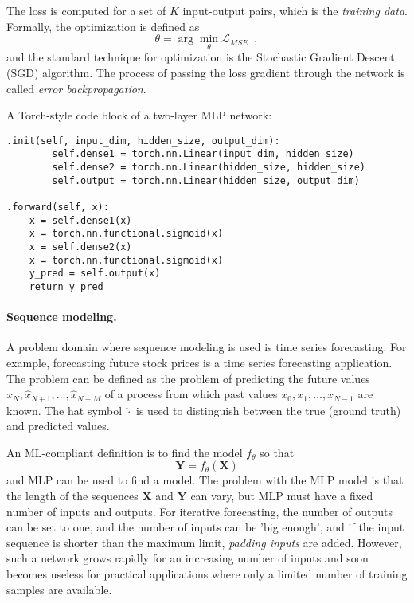 \documentclass[final]{article}
\begin{document}
The loss is computed for a set of $K$ input-output pairs, which is
the \textit{training data}. Formally, the optimization is defined
as
\[
\theta = \arg\min_{\theta} \mathcal{L}_{MSE} \enspace ,
\]
and the standard technique for optimization is the Stochastic Gradient
Descent (SGD) algorithm. The process of passing the loss gradient
through the network is called \textit{error backpropagation}.

A Torch-style code block of a two-layer MLP network:
\begin{lstlisting}
.init(self, input_dim, hidden_size, output_dim):
        self.dense1 = torch.nn.Linear(input_dim, hidden_size)
        self.dense2 = torch.nn.Linear(hidden_size, hidden_size)
        self.output = torch.nn.Linear(hidden_size, output_dim)

.forward(self, x):
    x = self.dense1(x)
    x = torch.nn.functional.sigmoid(x)
    x = self.dense2(x)
    x = torch.nn.functional.sigmoid(x)
    y_pred = self.output(x)
    return y_pred
\end{lstlisting}



\paragraph{Sequence modeling.}
A problem domain where sequence modeling is used is time series
forecasting. For example, forecasting future stock prices is a time
series forecasting application. The problem can be defined as the
problem of predicting the future values
$\hat{x}_N, \hat{x}_{N+1}, \ldots, \hat{x}_{N+M}$ of a process
from which past values $x_0, x_{1}, \ldots, x_{N-1}$ are known.
The hat symbol $\hat{\cdot}$ is used to distinguish between the true
(ground truth) and predicted values.

An ML-compliant definition is to find the model $f_\theta$ so that
\[
\mathbf{Y} = f_\theta (\mathbf{X}) 
\]
and MLP can be used to find a model. The problem with the MLP model is
that the length of the sequences $\mathbf{X}$ and $\mathbf{Y}$ can vary,
but MLP must have a fixed number of inputs and outputs. For iterative
forecasting, the number of outputs can be set to one, and the number
of inputs can be 'big enough', and if the input sequence is
shorter than the maximum limit, \textit{padding inputs} are added.
However, such a network grows rapidly for an increasing number of
inputs and soon becomes useless for practical applications where only
a limited number of training samples are available.
\end{document}
